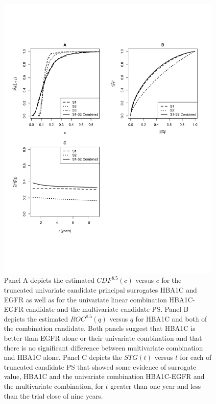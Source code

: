 \documentclass[times, doublespace]{simauth}
\begin{document}
\begin{figure}
\begin{center}
\includegraphics[scale=0.65]{dcct-example-figure-2014-6-2.pdf}
\end{center}
\caption{Panel A depicts the estimated $CDF^{8.5}(c)$ versus $c$ for the truncated univariate candidate principal surrogates HBA1C and EGFR as well as for the univariate linear combination HBA1C-EGFR candidate and the multivariate candidate PS. Panel B depicts the estimated $ROC^{8.5}(q)$ versus $q$ for HBA1C and both of the combination candidate. Both panels suggest that HBA1C is better than EGFR alone or their univariate combination and that there is no significant difference between multivariate combination and HBA1C alone. Panel C depicts the $STG(t)$ versus $t$ for each of truncated candidate PS that showed some evidence of surrogate value, HBA1C and the univariate combination HBA1C-EGFR and the multivariate combination, for $t$ greater than one year and less than the trial close of nine years. \label{exp}}
\end{figure}
\end{document}

